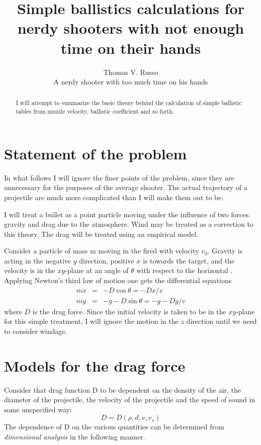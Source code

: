 
\author{Thomas V. Russo\\A nerdy shooter with too much time on his hands}
\title{Simple ballistics calculations for nerdy shooters with not
enough time on their hands}
\maketitle
\begin{abstract}
I will attempt to summarize the basic theory behind the calculation of
simple ballistic tables from muzzle velocity, ballistic coefficient
and so forth.
\end{abstract}
\section{Statement of the problem}
In what follows I will ignore the finer points of the problem, since
they are unnecessary for the purposes of the average shooter.  The
actual trajectory of a projectile are much more complicated than I
will make them out to be.  

I will treat a bullet as a point particle moving under the influence
of two forces: gravity and drag due to the atmosphere. Wind may be
treated as a correction to this theory.  The drag will be treated
using an empirical model.

Consider a particle of mass m moving in the fired with velocity $v_0$.
Gravity is acting in the negative $y$ direction, positive $x$ is
towards the target, and the velocity is in the $xy$-plane at an angle
of $\theta$ with respect to the horizontal .  Applying Newton's third
law of motion one gets the differential equations
\begin{eqnarray}
\label{eq:newton-3}
m\ddot{x} &=& -D\cos\theta =-D \dot{x}/v\\
m\ddot{y} &=& -g - D\sin\theta = -g - D \dot{y}/v 
\end{eqnarray}
where $D$ is the drag force.  Since the initial velocity is taken
to be in the $xy$-plane for this simple treatment, I will ignore the
motion in the $z$ direction until we need to consider windage.

\section{Models for the drag force}
Consider that drag function D to be dependent on the density of the
air, the diameter of the projectile, the velocity of the projectile
and the speed of sound in some unspecified way:
\begin{equation} D=D(\rho,d,v,v_s) \end{equation}
The dependence of D on the various quantities can be determined from
{\em dimensional analysis} in the following manner.

